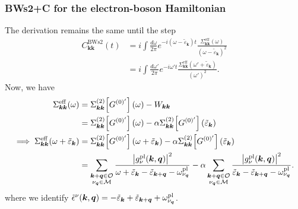 \subsubsection{BWs2+C for the electron-boson Hamiltonian}
The derivation remains the same until the step
\begin{align}
C_{\bm{k}\bm{k}}^{\mathrm{BWs2}}(t)
&=
i \int \frac{d\omega}{2\pi}
e^{-i(\omega - \tilde{\varepsilon}_{\bm{k}})t}
\frac{\Sigma^{\mathrm{eff}}_{\bm{k}\bm{k}}(\omega)}
     {(\omega - \tilde{\varepsilon}_{\bm{k}})^2} \\
&=
i \int \frac{d\omega'}{2\pi}
e^{-i\omega' t}
\frac{\Sigma^{\mathrm{eff}}_{\bm{k}\bm{k}}(\omega' + \tilde{\varepsilon}_{\bm{k}})}
     {(\omega')^2}. %
\end{align}
Now, we have 
\begin{align}
\Sigma^{\mathrm{eff}}_{\bm{k}\bm{k}}(\omega) &=
\Sigma_{\bm{k}\bm{k}}^{(2)}\!\left[ G^{(0)'} \right](\omega)
-  W_{\bm{k}\bm{k}} \\
&=
\Sigma_{\bm{k}\bm{k}}^{(2)}\!\left[ G^{(0)'} \right](\omega)
- \alpha \Sigma_{\bm{k}\bm{k}}^{(2)}\!\left[ G^{(0)'} \right](\tilde{\varepsilon}_{\bm{k}})\\
\implies \Sigma^{\mathrm{eff}}_{\bm{k}\bm{k}}(\omega + \tilde{\varepsilon}_{\bm{k}}) &=
\Sigma_{\bm{k}\bm{k}}^{(2)}\!\left[ G^{(0)'} \right](\omega + \tilde{\varepsilon}_{\bm{k}})
- \alpha \Sigma_{\bm{k}\bm{k}}^{(2)}\!\left[ G^{(0)'} \right](\tilde{\varepsilon}_{\bm{k}})\\
&= \sum_{\substack{\bm{k}+\bm{q}\in\mathcal{O}\\\nu_{\bm{q}}\in\mathcal{M}}} \frac{\left|g_{\nu}^{\rm pl}(\bm{k},\bm{q})\right|^2}{\omega+\tilde{\varepsilon}_{\bm{k}}-\tilde{\varepsilon}_{\bm{k}+\bm{q}}-\omega_{\nu_{\bm{q}}}^{\rm pl}} - \alpha \sum_{\substack{\bm{k}+\bm{q}\in\mathcal{O}\\\nu_{\bm{q}}\in\mathcal{M}}} \frac{\left|g_{\nu}^{\rm pl}(\bm{k},\bm{q})\right|^2}{\tilde{\varepsilon}_{\bm{k}}-\tilde{\varepsilon}_{\bm{k}+\bm{q}}-\omega_{\nu_{\bm{q}}}^{\rm pl}}.
\end{align}
where we identify $\tilde{\epsilon}^\nu(\bm{k},\bm{q}) = -\tilde{\varepsilon}_{\bm{k}}+\tilde{\varepsilon}_{\bm{k}+\bm{q}}+\omega_{\nu_{\bm{q}}}^{\rm pl}$.
